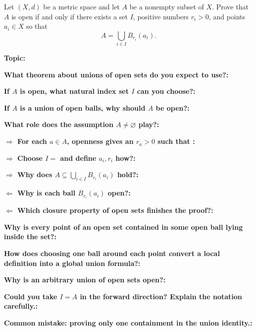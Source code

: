 \documentclass[12pt]{article}
\newcommand{\fillfield}[1]{%
  \par\noindent\textbf{#1:}\enspace\hrulefill\par\vspace{3pt}%
}
\begin{document}
\begin{tcolorbox}[
  enhanced, breakable,
  colback  = probblue,
  colframe = blue!55!black,
  fonttitle = \bfseries,
  title = {\textsc{Problem Statement}\hfill Homework 8, Problem 6}
]
Let $(X, d)$ be a metric space and let $A$ be a nonempty subset of $X$. Prove that $A$ is open
if and only if there exists a set $I$, positive numbers $r_i > 0$, and points $a_i \in X$ so
that
\[
  A = \bigcup_{i \in I} B_{r_i}(a_i).
\]
\end{tcolorbox}

\bigskip

\begin{tcolorbox}[
  enhanced, breakable,
  colback  = pass1green,
  colframe = green!55!black,
  fonttitle = \bfseries,
  title = {Pass 1 \enspace\textbf{--}\enspace First Diagnosis}
]
\fillfield{Topic}
\fillfield{What theorem about unions of open sets do you expect to use?}
\fillfield{If $A$ is open, what natural index set $I$ can you choose?}
\fillfield{If $A$ is a union of open balls, why should $A$ be open?}
\fillfield{What role does the assumption $A\ne\varnothing$ play?}
\end{tcolorbox}

\bigskip

\begin{tcolorbox}[
  enhanced, breakable,
  colback  = pass2yellow,
  colframe = yellow!65!black,
  fonttitle = \bfseries,
  title = {Pass 2 \enspace\textbf{--}\enspace Proof Recipe Card}
]
\fillfield{$\Longrightarrow$ For each $a\in A$, openness gives an $r_a>0$ such that \dotfill}
\fillfield{$\Longrightarrow$ Choose $I=$\hspace{1cm} and define $a_i,r_i$ how?}
\fillfield{$\Longrightarrow$ Why does $A\subseteq \bigcup_{i\in I} B_{r_i}(a_i)$ hold?}
\fillfield{$\Longleftarrow$ Why is each ball $B_{r_i}(a_i)$ open?}
\fillfield{$\Longleftarrow$ Which closure property of open sets finishes the proof?}
\end{tcolorbox}

\bigskip

\begin{tcolorbox}[
  enhanced, breakable,
  colback  = pass3orange,
  colframe = orange!65!black,
  fonttitle = \bfseries,
  title = {Pass 3 \enspace\textbf{--}\enspace Self-Explanation}
]
\fillfield{Why is every point of an open set contained in some open ball lying inside the set?}
\fillfield{How does choosing one ball around each point convert a local definition into a global union formula?}
\fillfield{Why is an arbitrary union of open sets open?}
\fillfield{Could you take $I=A$ in the forward direction? Explain the notation carefully.}
\fillfield{Common mistake: proving only one containment in the union identity.}
\end{tcolorbox}
\end{document}
